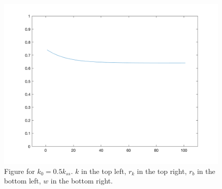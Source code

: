 \documentclass[10pt,letter]{article}
\begin{document}
\begin{figure}
\includegraphics[scale=0.2]{ps2q3_4w2}
\caption{
Figure for $k_0 = 0.5 k_{ss}$. $k$ in the top left, $r_k$ in the top right, $r_b$ in the bottom left, $w$ in the bottom right.
}
\end{figure}
\end{document}

